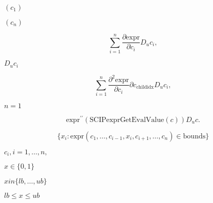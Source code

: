 \documentclass{article}
\begin{document}
$(c_1)$
\pagebreak

$(c_n)$
\pagebreak

\[
   \sum_{i = 1}^n \frac{\partial \text{expr}}{\partial c_i} D_u c_i,
\]
\pagebreak

$ D_u c_i $
\pagebreak

\[
   \sum_{i = 1}^n \frac{\partial^2 \text{expr}}{\partial c_i} \partial c_{\text{childidx}} D_u c_i,
\]
\pagebreak

$ n = 1 $
\pagebreak

\[
   \text{expr}^{\prime \prime}(\text{SCIPexprGetEvalValue}(c))  D_u c.
\]
\pagebreak

\[
  \{ x_i : \text{expr}(c_1,\ldots,c_{i-1},x_i,c_{i+1},\ldots,c_n) \in \text{bounds} \}
\]
\pagebreak

$c_i, i=1,\ldots,n,$
\pagebreak

$ x \in \{0,1\} $
\pagebreak

$ x in \{lb, \dots, ub\} $
\pagebreak

$ lb \leq x \leq ub $
\pagebreak
\end{document}
